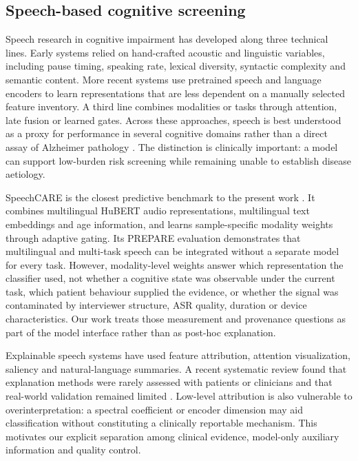 \documentclass[pdflatex,sn-nature]{sn-jnl}
\begin{document}
\subsection{Speech-based cognitive screening}

Speech research in cognitive impairment has developed along three technical lines. Early systems relied on hand-crafted acoustic and linguistic variables, including pause timing, speaking rate, lexical diversity, syntactic complexity and semantic content. More recent systems use pretrained speech and language encoders to learn representations that are less dependent on a manually selected feature inventory. A third line combines modalities or tasks through attention, late fusion or learned gates. Across these approaches, speech is best understood as a proxy for performance in several cognitive domains rather than a direct assay of Alzheimer pathology \cite{Heitz2026}. The distinction is clinically important: a model can support low-burden risk screening while remaining unable to establish disease aetiology.

SpeechCARE is the closest predictive benchmark to the present work \cite{Azadmaleki2025}. It combines multilingual HuBERT audio representations, multilingual text embeddings and age information, and learns sample-specific modality weights through adaptive gating. Its PREPARE evaluation demonstrates that multilingual and multi-task speech can be integrated without a separate model for every task. However, modality-level weights answer which representation the classifier used, not whether a cognitive state was observable under the current task, which patient behaviour supplied the evidence, or whether the signal was contaminated by interviewer structure, ASR quality, duration or device characteristics. Our work treats those measurement and provenance questions as part of the model interface rather than as post-hoc explanation.

Explainable speech systems have used feature attribution, attention visualization, saliency and natural-language summaries. A recent systematic review found that explanation methods were rarely assessed with patients or clinicians and that real-world validation remained limited \cite{Shankar2025}. Low-level attribution is also vulnerable to overinterpretation: a spectral coefficient or encoder dimension may aid classification without constituting a clinically reportable mechanism. This motivates our explicit separation among clinical evidence, model-only auxiliary information and quality control.
\end{document}
